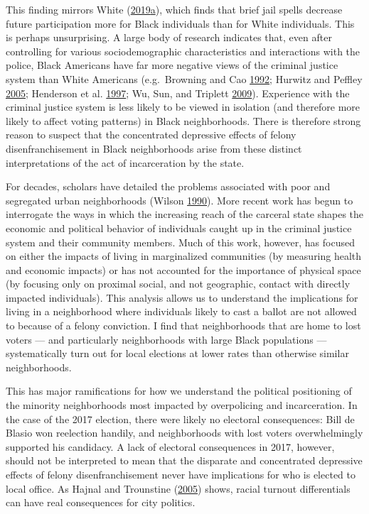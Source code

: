 \documentclass[
  12pt,
]{article}
\begin{document}
This finding mirrors White (\protect\hyperlink{ref-White2019}{2019}\protect\hyperlink{ref-White2019}{a}), which finds that brief jail spells decrease future participation more for Black individuals than for White individuals. This is perhaps unsurprising. A large body of research indicates that, even after controlling for various sociodemographic characteristics and interactions with the police, Black Americans have far more negative views of the criminal justice system than White Americans (e.g.~Browning and Cao \protect\hyperlink{ref-Browning1992}{1992}; Hurwitz and Peffley \protect\hyperlink{ref-Hurwitz2005}{2005}; Henderson et al. \protect\hyperlink{ref-Henderson1997}{1997}; Wu, Sun, and Triplett \protect\hyperlink{ref-Wu2009}{2009}). Experience with the criminal justice system is less likely to be viewed in isolation (and therefore more likely to affect voting patterns) in Black neighborhoods. There is therefore strong reason to suspect that the concentrated depressive effects of felony disenfranchisement in Black neighborhoods arise from these distinct interpretations of the act of incarceration by the state.

For decades, scholars have detailed the problems associated with poor and segregated urban neighborhoods (Wilson \protect\hyperlink{ref-Wilson1990}{1990}). More recent work has begun to interrogate the ways in which the increasing reach of the carceral state shapes the economic and political behavior of individuals caught up in the criminal justice system and their community members. Much of this work, however, has focused on either the impacts of living in marginalized communities (by measuring health and economic impacts) or has not accounted for the importance of physical space (by focusing only on proximal social, and not geographic, contact with directly impacted individuals). This analysis allows us to understand the implications for living in a neighborhood where individuals likely to cast a ballot are not allowed to because of a felony conviction. I find that neighborhoods that are home to lost voters --- and particularly neighborhoods with large Black populations --- systematically turn out for local elections at lower rates than otherwise similar neighborhoods.

This has major ramifications for how we understand the political positioning of the minority neighborhoods most impacted by overpolicing and incarceration. In the case of the 2017 election, there were likely no electoral consequences: Bill de Blasio won reelection handily, and neighborhoods with lost voters overwhelmingly supported his candidacy. A lack of electoral consequences in 2017, however, should not be interpreted to mean that the disparate and concentrated depressive effects of felony disenfranchisement never have implications for who is elected to local office. As Hajnal and Trounstine (\protect\hyperlink{ref-Hajnal2005}{2005}) shows, racial turnout differentials can have real consequences for city politics.
\end{document}
